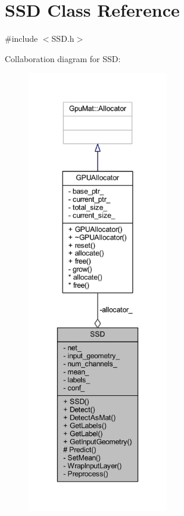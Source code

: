\hypertarget{class_s_s_d}{}\section{S\+SD Class Reference}
\label{class_s_s_d}


{\ttfamily \#include $<$S\+S\+D.\+h$>$}



Collaboration diagram for S\+SD\+:\nopagebreak
\begin{figure}[H]
\begin{center}
\leavevmode
\includegraphics[height=550pt]{class_s_s_d__coll__graph}
\end{center}
\end{figure}
